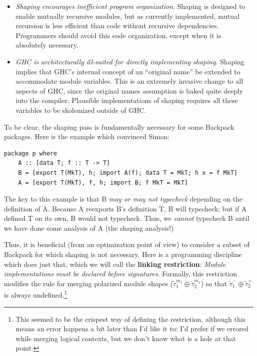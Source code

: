 \documentclass{article}
\begin{document}
\begin{itemize}
    \item \emph{Shaping encourages inefficient program organization.}
        Shaping is designed to enable mutually recursive modules, but as
        currently implemented, mutual recursion is less efficient than
        code without recursive dependencies. Programmers should avoid
        this code organization, except when it is absolutely necessary.

    \item \emph{GHC is architecturally ill-suited for directly
        implementing shaping.}  Shaping implies that GHC's internal
        concept of an ``original name'' be extended to accommodate
        module variables.  This is an extremely invasive change to all
        aspects of GHC, since the original names assumption is baked
        quite deeply into the compiler.  Plausible implementations of
        shaping requires all these variables to be skolemized outside
        of GHC\@.

\end{itemize}

To be clear, the shaping pass is fundamentally necessary for some
Backpack packages.  Here is the example which convinced Simon:

\begin{verbatim}
package p where
    A :: [data T; f :: T -> T]
    B = [export T(MkT), h; import A(f); data T = MkT; h x = f MkT]
    A = [export T(MkT), f, h; import B; f MkT = MkT]
\end{verbatim}

The key to this example is that B \emph{may or may not typecheck} depending
on the definition of A. Because A reexports B's definition T, B will
typecheck; but if A defined T on its own, B would not typecheck.  Thus,
we \emph{cannot} typecheck B until we have done some analysis of A (the
shaping analysis!)

Thus, it is beneficial (from an optimization point of view) to
consider a subset of Backpack for which shaping is not necessary.
Here is a programming discipline which does just that, which we will call the \textbf{linking restriction}: \emph{Module implementations must be declared before
signatures.}  Formally, this restriction modifies the rule for merging
polarized module shapes ($\widetilde{\tau}_1^{m_1} \oplus \widetilde{\tau}_2^{m_2}$) so that
$\widetilde{\tau}_1^- \oplus \widetilde{\tau}_2^+$ is always undefined.\footnote{This seemed to be the crispest way of defining the restriction, although this means an error happens a bit later than I'd like it to: I'd prefer if we errored while merging logical contexts, but we don't know what is a hole at that point.}
\end{document}
